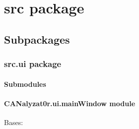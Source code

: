 \documentclass[letterpaper,10pt,english]{sphinxmanual}
\begin{document}
\chapter{src package}
\label{\detokenize{src::doc}}\label{\detokenize{src:src-package}}

\section{Subpackages}
\label{\detokenize{src:subpackages}}

\subsection{src.ui package}
\label{\detokenize{src.ui:src-ui-package}}\label{\detokenize{src.ui::doc}}

\subsubsection{Submodules}
\label{\detokenize{src.ui:submodules}}

\subsubsection{CANalyzat0r.ui.mainWindow module}
\label{\detokenize{src.ui:module-src.ui.mainWindow}}\label{\detokenize{src.ui:canalyzat0r-ui-mainwindow-module}}

\begin{fulllineitems}
\label{\detokenize{src.ui:src.ui.mainWindow.Ui_CANalyzatorMainWindow}}
Bases: 

\begin{fulllineitems}
\label{\detokenize{src.ui:src.ui.mainWindow.Ui_CANalyzatorMainWindow.retranslateUi}}
\end{fulllineitems}


\begin{fulllineitems}
\label{\detokenize{src.ui:src.ui.mainWindow.Ui_CANalyzatorMainWindow.setupUi}}
\end{fulllineitems}


\end{fulllineitems}
\end{document}
